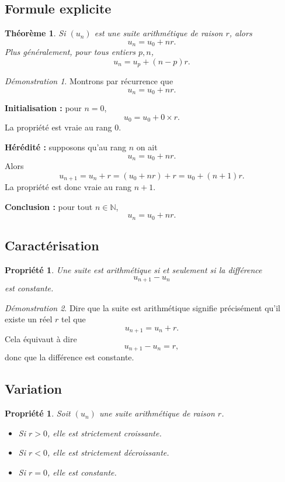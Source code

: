 \documentclass[11pt,a4paper]{article}
\theoremstyle{definition}
\theoremstyle{plain}
\newtheorem{propriete}[definition]{Propriété}
\newtheorem{theoreme}[definition]{Théorème}
\theoremstyle{remark}
\newtheorem*{demonstrationlibre}{Démonstration}
\newcommand{\N}{\mathbb{N}}
\begin{document}
\subsection{Formule explicite}

\begin{theoreme}
Si $(u_n)$ est une suite arithmétique de raison $r$, alors
\[
u_n=u_0+nr.
\]
Plus généralement, pour tous entiers $p,n$,
\[
u_n=u_p+(n-p)r.
\]
\end{theoreme}

\begin{demonstrationlibre}
Montrons par récurrence que
\[
u_n=u_0+nr.
\]

\textbf{Initialisation :} pour $n=0$,
\[
u_0=u_0+0\times r.
\]
La propriété est vraie au rang $0$.

\textbf{Hérédité :} supposons qu'au rang $n$ on ait
\[
u_n=u_0+nr.
\]
Alors
\[
u_{n+1}=u_n+r=(u_0+nr)+r=u_0+(n+1)r.
\]
La propriété est donc vraie au rang $n+1$.

\textbf{Conclusion :} pour tout $n\in\N$,
\[
u_n=u_0+nr.
\]
\end{demonstrationlibre}

\subsection{Caractérisation}

\begin{propriete}
Une suite est arithmétique si et seulement si la différence
\[
u_{n+1}-u_n
\]
est constante.
\end{propriete}

\begin{demonstrationlibre}
Dire que la suite est arithmétique signifie précisément qu'il existe un réel $r$ tel que
\[
u_{n+1}=u_n+r.
\]
Cela équivaut à dire
\[
u_{n+1}-u_n=r,
\]
donc que la différence est constante.
\end{demonstrationlibre}

\subsection{Variation}

\begin{propriete}
Soit $(u_n)$ une suite arithmétique de raison $r$.
\begin{itemize}[leftmargin=0.8cm]
    \item Si $r>0$, elle est strictement croissante.
    \item Si $r<0$, elle est strictement décroissante.
    \item Si $r=0$, elle est constante.
\end{itemize}
\end{propriete}
\end{document}
